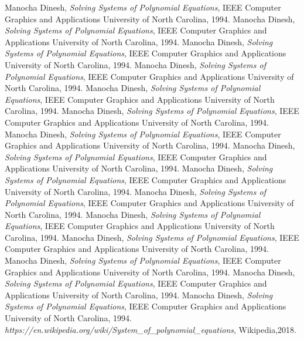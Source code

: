 \documentclass[11pt]{article}
\begin{document}
\begin{thebibliography}{1}
  Manocha Dinesh,
  \textit{Solving Systems of Polynomial Equations},
   IEEE Computer Graphics and Applications
   University of North Carolina,
   1994.
  Manocha Dinesh,
  \textit{Solving Systems of Polynomial Equations},
   IEEE Computer Graphics and Applications
   University of North Carolina,
   1994.
  Manocha Dinesh,
  \textit{Solving Systems of Polynomial Equations},
   IEEE Computer Graphics and Applications
   University of North Carolina,
   1994.
  Manocha Dinesh,
  \textit{Solving Systems of Polynomial Equations},
   IEEE Computer Graphics and Applications
   University of North Carolina,
   1994.
  Manocha Dinesh,
  \textit{Solving Systems of Polynomial Equations},
   IEEE Computer Graphics and Applications
   University of North Carolina,
   1994.
  Manocha Dinesh,
  \textit{Solving Systems of Polynomial Equations},
   IEEE Computer Graphics and Applications
   University of North Carolina,
   1994.
  Manocha Dinesh,
  \textit{Solving Systems of Polynomial Equations},
   IEEE Computer Graphics and Applications
   University of North Carolina,
   1994.
  Manocha Dinesh,
  \textit{Solving Systems of Polynomial Equations},
   IEEE Computer Graphics and Applications
   University of North Carolina,
   1994.
  Manocha Dinesh,
  \textit{Solving Systems of Polynomial Equations},
   IEEE Computer Graphics and Applications
   University of North Carolina,
   1994.
  Manocha Dinesh,
  \textit{Solving Systems of Polynomial Equations},
   IEEE Computer Graphics and Applications
   University of North Carolina,
   1994.
  Manocha Dinesh,
  \textit{Solving Systems of Polynomial Equations},
   IEEE Computer Graphics and Applications
   University of North Carolina,
   1994.
  Manocha Dinesh,
  \textit{Solving Systems of Polynomial Equations},
   IEEE Computer Graphics and Applications
   University of North Carolina,
   1994.
  Manocha Dinesh,
  \textit{Solving Systems of Polynomial Equations},
   IEEE Computer Graphics and Applications
   University of North Carolina,
   1994.
  Manocha Dinesh,
  \textit{Solving Systems of Polynomial Equations},
   IEEE Computer Graphics and Applications
   University of North Carolina,
   1994.
  Manocha Dinesh,
  \textit{Solving Systems of Polynomial Equations},
   IEEE Computer Graphics and Applications
   University of North Carolina,
   1994.
  \textit{ https://en.wikipedia.org/wiki/System\_of\_polynomial\_equations},
   Wikipedia,2018.

\end{thebibliography}
\end{document}

